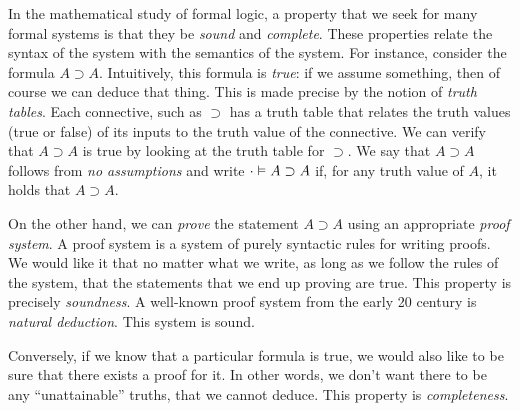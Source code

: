 \documentclass[11pt,letterpaper]{article}
\renewcommand{\implies}{\supset}
\begin{document}
In the mathematical study of formal logic, a property that we seek for many
formal systems is that they be \emph{sound} and \emph{complete}.
These properties relate the syntax of the system with the semantics of the
system. For instance, consider the formula $A \implies A$.
Intuitively, this formula is \emph{true}: if we
assume something, then of course we can deduce that thing.
This is made precise by the notion of \emph{truth tables}.
Each connective, such as $\implies$ has a truth table that relates the truth
values (true or false) of its inputs to the truth value of the connective.
We can verify that $A \implies A$ is true by looking at the truth table for
$\implies$.
We say that $A \implies A$ follows from \emph{no assumptions} and write
$\cdot \entails A \implies A$ if, for any truth value of $A$,
it holds that $A \implies A$.

On the other hand, we can \emph{prove} the statement $A \implies A$ using an
appropriate \emph{proof system}. A proof system is a system of purely syntactic
rules for writing proofs.
We would like it that no matter what we write, as long as we follow the rules
of the system, that the statements that we end up proving are true. This
property is precisely \emph{soundness}.
A well-known proof system from the early 20\th{} century is \emph{natural
deduction}. This system is sound.

Conversely, if we know that a particular formula is true, we would also like to
be sure that there exists a proof for it. In other words, we don't want there
to be any ``unattainable'' truths, that we cannot deduce. This property is
\emph{completeness}.
\end{document}
